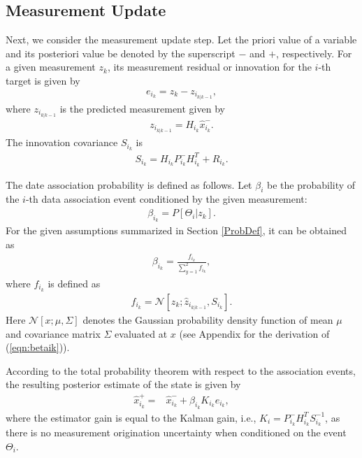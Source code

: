 \documentclass[letterpaper, 10pt, conference]{ieeeconf}
\newcommand{\refeqn}[1]{(\ref{eqn:#1})}
\begin{document}
\subsection{Measurement Update}

Next, we consider the measurement update step. Let  the priori value of a variable and its posteriori value be denoted by the superscript $-$ and $+$, respectively. For a given measurement $z_{k}$, its measurement residual or innovation for the $i$-th target is given by
\begin{align*}
e_{i_k} = z_k - z_{i_{k|k-1}},
\end{align*}
where $z_{i_{k|k-1}}$ is the predicted measurement given by
\begin{align}
z_{i_{k|k-1}} = H_{i_k} \hat x_{i_k}^-.
\end{align}
The innovation covariance $S_{i_k}$ is
\begin{align}
S_{i_k}=H_{i_k}P_{i_k}^{-}H_{i_k}^T+R_{i_k}.
\end{align}


The date association probability is defined as follows. Let $\beta_i$ be the probability of the $i$-th data association event conditioned by the given measurement:
\begin{align*}
\beta_{i_k} = P[\Theta_i|z_k].
\end{align*}
For the given assumptions summarized in Section \ref{ProbDef}, it can be obtained as
\begin{align}
\beta_{i_k}=\frac{f_{i_k}}{\sum\limits_{y=1}^2 f_{i_k}},\label{eqn:betaik}
\end{align}
where $f_{i_k}$ is defined as
\begin{align}
f_{i_k}=\mathcal{N}[z_{k};\hat z_{i_{k|k-1}},S_{i_k}].
\end{align}
Here $\mathcal{N}[x;\mu,\Sigma]$ denotes the Gaussian probability density function of mean $\mu$ and covariance matrix $\Sigma$ evaluated at $x$ (see Appendix for the derivation of \refeqn{betaik}).

According to the total probability theorem with respect to the association events, the resulting posterior estimate of the state is given by
\begin{align}
\hat x^+_{i_k}=&\hat x^-_{i_k}+\beta_{i_k}K_{i_k}e_{i_k}\label{KalEst},
\end{align}
where the estimator gain is equal to the Kalman gain, i.e., $K_i = P_{i_k}^{-} H_{i_k}^T S_{i_k}^{-1}$, as there is no measurement origination uncertainty when conditioned on the event $\Theta_i$. 
\end{document}
